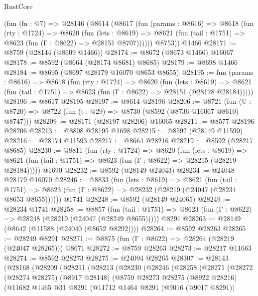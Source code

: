 \begin{lexlean}{RustCore}
\begin{coremodule}
    (fun (fn : @7) =>
    @28146
      (@8614
        (@8617
          (fun (params : @8616) =>
          @8618
            (fun (rty : @1724) =>
            @8620
              (fun (lets : @8619) =>
              @8621 (fun (tail : @1751) => @8623 (fun (Γ : @8622) => @28151 @8707))))))
        @8753))
    @1466
@28171 := @8759 (@28144 (@8609 @1466))
@28174 := @8672 (@8673 @1466) @16067
@28178 := @8592 (@8664 (@28174 @8681) @8685)
@28179 := @8698 @1466
@28184 := @8695 (@8697 @28179 @16070 @8653 @8655)
@28195 := fun (params : @8616) =>
  @8618
    (fun (rty : @1724) =>
    @8620
      (fun (lets : @8619) =>
      @8621 (fun (tail : @1751) => @8623 (fun (Γ : @8622) => @28151 (@28178 @28184)))))
@28196 := @8617 @28195
@28197 := @8614 @28196
@28206 := @8721
    (fun (U : @8720) => @8722 (fun (t : @29) => @8730 (@8592 (@8736 @16067 @8610) @8747)))
@28209 := @28171 (@28197 @28206) @16065
@28211 := @8577 @28196 @28206
@28213 := @8808 @28195 @1698
@28215 := @8592 (@28149 @11590)
@28216 := @28174 @11593
@28217 := @8664 @28216
@28219 := @8592 (@28217 @8685)
@28230 := @8811
    (fun (rty : @1724) =>
    @8620
      (fun (lets : @8619) =>
      @8621 (fun (tail : @1751) => @8623 (fun (Γ : @8622) => @28215 (@28219 @28184)))))
    @1690
@28232 := @8592 (@28149 @24043)
@28234 := @24048 @28179 @16070
@28246 := @8833
    (fun (lets : @8619) =>
    @8621
      (fun (tail : @1751) =>
      @8623 (fun (Γ : @8622) => @28232 (@28219 (@24047 (@28234 @8653 @8655))))))
    @1741
@28248 := @8592 (@28149 @24065)
@28249 := @28234 @1741
@28258 := @8857
    (fun (tail : @1751) => @8623 (fun (Γ : @8622) => @28248 (@28219 (@24047 (@28249 @8655)))))
    @8291
@28263 := @28149 (@8642 (@11588 (@24040 (@8652 @8292))))
@28264 := @8592 @28263
@28265 := @28249 @8291
@28271 := @8875 (fun (Γ : @8622) => @28264 (@28219 (@24047 @28265))) @8671
@28272 := @8759 @28263
@28273 := @28217 @11663
@28274 := @8592 @28273
@28275 := @24094 @28265
@28307 := @28143
    (@28168
      (@28209
        (@28211
          (@28213
            (@28230
              (@28246
                (@28258
                  (@28271
                    (@28272
                      (@28274 @28275)
                      (@8917 @28148)
                      (@8759
                        @28273
                        @28275
                        (@8922 @28216)
                        (@11682
                          @1465
                          @31
                          @8291
                          (@11712
                            @1464
                            @8291
                            (@9016 (@9017 @8291))

\end{coremodule}
\end{lexlean}
